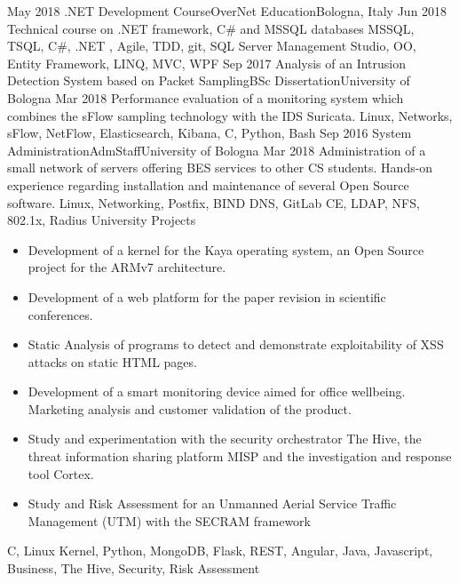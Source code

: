 \begin{experiences}
  \experience
  {May 2018}   {.NET Development Course}{OverNet Education}{Bologna, Italy}
  {Jun 2018} {
                    Technical course on .NET framework, C\# and MSSQL databases
                  }
                  {MSSQL, TSQL, C\#, .NET , Agile, TDD, git, SQL Server Management Studio, OO, Entity Framework, LINQ, MVC, WPF}
\emptySeparator
  \experience
    {Sep 2017}   {Analysis of an Intrusion Detection System based on Packet Sampling}{BSc Dissertation}{University of Bologna}
    {Mar 2018} {
                      Performance evaluation of a monitoring system which combines the sFlow sampling technology with the IDS Suricata.
                    }
                    {Linux, Networks, sFlow, NetFlow, Elasticsearch, Kibana, C, Python, Bash}
  \emptySeparator
  \experience
    {Sep 2016}   {System Administration}{AdmStaff}{University of Bologna}
    {Mar 2018} {
                      Administration of a small network of servers offering BES services to other CS students. \linebreak
                      Hands-on experience regarding installation and maintenance of several Open Source software.
                    }
                    {Linux, Networking, Postfix, BIND DNS, GitLab CE, LDAP, NFS, 802.1x, Radius}
  \emptySeparator
  \experience
    {}   {University Projects}{}{}
    {} {
                  \begin{itemize}
                    \item Development of a kernel for the Kaya operating system, an Open Source project for the ARMv7 architecture.
                    \item Development of a web platform for the paper revision in scientific conferences.
                    \item Static Analysis of programs to detect and demonstrate exploitability of XSS attacks on static HTML pages.
                    \item Development of a smart monitoring device aimed for office wellbeing. Marketing analysis and customer validation of the product.
                    \item Study and experimentation with the security orchestrator The Hive, the threat information sharing platform MISP and the investigation and response tool Cortex.
                    \item Study and Risk Assessment for an Unmanned Aerial Service Traffic Management (UTM) with the SECRAM framework
                  \end{itemize}
                }
                  {C, Linux Kernel, Python, MongoDB, Flask, REST, Angular, Java, Javascript, Business, The Hive, Security, Risk Assessment }
  \emptySeparator
\end{experiences}

